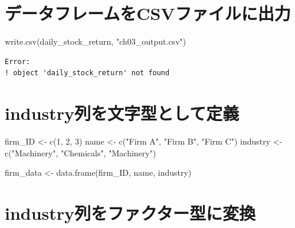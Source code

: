 \documentclass[
  letterpaper,
  DIV=11,
  numbers=noendperiod]{scrreprt}
\newenvironment{Shaded}{\begin{snugshade}}{\end{snugshade}}
\newcommand{\DecValTok}[1]{\textcolor[rgb]{0.68,0.00,0.00}{#1}}
\newcommand{\FunctionTok}[1]{\textcolor[rgb]{0.28,0.35,0.67}{#1}}
\newcommand{\NormalTok}[1]{\textcolor[rgb]{0.00,0.23,0.31}{#1}}
\newcommand{\OtherTok}[1]{\textcolor[rgb]{0.00,0.23,0.31}{#1}}
\newcommand{\SpecialCharTok}[1]{\textcolor[rgb]{0.37,0.37,0.37}{#1}}
\newcommand{\StringTok}[1]{\textcolor[rgb]{0.13,0.47,0.30}{#1}}
\begin{document}
\section{データフレームをCSVファイルに出力}\label{ux30c7ux30fcux30bfux30d5ux30ecux30fcux30e0ux3092csvux30d5ux30a1ux30a4ux30ebux306bux51faux529b}

\begin{Shaded}
\begin{Highlighting}[]
\FunctionTok{write.csv}\NormalTok{(daily\_stock\_return, }\StringTok{"ch03\_output.csv"}\NormalTok{)}
\end{Highlighting}
\end{Shaded}

\begin{verbatim}
Error:
! object 'daily_stock_return' not found
\end{verbatim}

\section{industry列を文字型として定義}\label{industryux5217ux3092ux6587ux5b57ux578bux3068ux3057ux3066ux5b9aux7fa9}

\begin{Shaded}
\begin{Highlighting}[]
\NormalTok{firm\_ID }\OtherTok{\textless{}{-}} \FunctionTok{c}\NormalTok{(}\DecValTok{1}\NormalTok{, }\DecValTok{2}\NormalTok{, }\DecValTok{3}\NormalTok{)}
\NormalTok{name }\OtherTok{\textless{}{-}} \FunctionTok{c}\NormalTok{(}\StringTok{"Firm A"}\NormalTok{, }\StringTok{"Firm B"}\NormalTok{, }\StringTok{"Firm C"}\NormalTok{)}
\NormalTok{industry }\OtherTok{\textless{}{-}} \FunctionTok{c}\NormalTok{(}\StringTok{"Machinery"}\NormalTok{, }\StringTok{"Chemicals"}\NormalTok{, }\StringTok{"Machinery"}\NormalTok{)}

\NormalTok{firm\_data }\OtherTok{\textless{}{-}} \FunctionTok{data.frame}\NormalTok{(firm\_ID, name, industry) }
\end{Highlighting}
\end{Shaded}

\section{industry列をファクター型に変換}\label{industryux5217ux3092ux30d5ux30a1ux30afux30bfux30fcux578bux306bux5909ux63db}

\begin{Shaded}
\end{Shaded}
\end{document}
